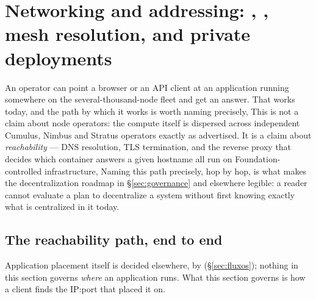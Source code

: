 \section{Networking and addressing: \FDM, \PDNS, mesh resolution, and private deployments}
\label{sec:networking}

An operator can point a browser or an API client at an application running somewhere on the
several-thousand-node \Flux fleet and get an answer. That works today, and the path by which it
works is worth naming precisely,  This is not a claim about node operators: the compute itself is dispersed across
independent Cumulus, Nimbus and Stratus operators exactly as advertised. It is a claim about
\emph{reachability} — DNS resolution, TLS termination, and the reverse proxy that decides which
container answers a given hostname all run on Foundation-controlled infrastructure,  Naming this
path precisely, hop by hop, is what makes the decentralization roadmap in \S\ref{sec:governance}
and elsewhere legible: a reader cannot evaluate a plan to decentralize a system without first
knowing exactly what is centralized in it today.

\subsection{The reachability path, end to end}
\label{sec:networking-path}

Application placement itself is decided elsewhere, by \FluxOS (\S\ref{sec:fluxos}); nothing in
this section governs \emph{where} an application runs. What this section governs is how a client
finds the IP:port that \FluxOS placed it on. \shipped

